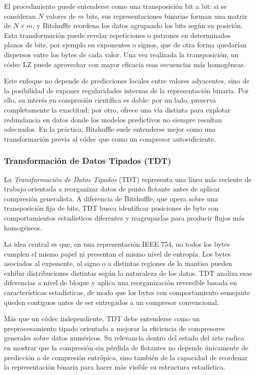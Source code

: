 El procedimiento puede entenderse como una transposición bit a bit: si se consideran
$N$ valores de $m$ bits, sus representaciones binarias forman una matriz de
$N \times m$, y Bitshuffle reordena los datos agrupando los bits según su posición. Esta
transformación puede revelar repeticiones o patrones en determinados planos de bits,
por ejemplo en exponentes o signos, que de otra forma quedarían dispersos entre los
bytes de cada valor. Una vez realizada la transposición, un códec LZ puede aprovechar
con mayor eficacia esas secuencias más homogéneas.

Este enfoque no depende de predicciones locales entre valores adyacentes, sino de la
posibilidad de exponer regularidades internas de la representación binaria. Por ello, su
interés en compresión científica es doble: por un lado, preserva completamente la
exactitud; por otro, ofrece una vía distinta para explotar redundancia en datos donde los
modelos predictivos no siempre resultan adecuados. En la práctica, Bitshuffle suele
entenderse mejor como una transformación previa al códec que como un compresor
autosuficiente.

\subsubsection{Transformación de Datos Tipados (TDT)}

La \textit{Transformación de Datos Tipados} (TDT)\parencite{jamalidinan2025tdt} representa
una línea más reciente de trabajo orientada a reorganizar datos de punto flotante antes
de aplicar compresión generalista. A diferencia de Bitshuffle, que opera sobre una
transposición fija de bits, TDT busca identificar posiciones de byte con comportamientos
estadísticos diferentes y reagruparlas para producir flujos más homogéneos.

La idea central es que, en una representación IEEE 754, no todos los bytes cumplen el
mismo papel ni presentan el mismo nivel de entropía. Los bytes asociados al exponente,
al signo o a distintas regiones de la mantisa pueden exhibir distribuciones distintas
según la naturaleza de los datos. TDT analiza esas diferencias a nivel de bloque y aplica
una reorganización reversible basada en características estadísticas, de modo que los
bytes con comportamiento semejante queden contiguos antes de ser entregados a un
compresor convencional.

Más que un códec independiente, TDT debe entenderse como un preprocesamiento
tipado orientado a mejorar la eficiencia de compresores generales sobre datos
numéricos. Su relevancia dentro del estado del arte radica en mostrar que la compresión
sin pérdida de flotantes no depende únicamente de predicción o de compresión
entrópica, sino también de la capacidad de reordenar la representación binaria para
hacer más visible su estructura estadística.

